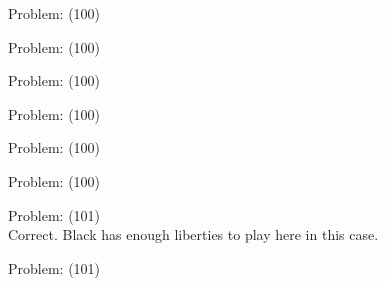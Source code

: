 \documentclass[11pt]{article}
\begin{document}
\begin{minipage}[t]{0.5\textwidth}
  {\centering
  
  Problem: (100)\\
  
  }
\end{minipage}
\begin{minipage}[t]{0.5\textwidth}
  {\centering
  
  Problem: (100)\\
  
  }
\end{minipage}
\begin{minipage}[t]{0.5\textwidth}
  {\centering
  
  Problem: (100)\\
  
  }
\end{minipage}
\begin{minipage}[t]{0.5\textwidth}
  {\centering
  
  Problem: (100)\\
  
  }
\end{minipage}
\begin{minipage}[t]{0.5\textwidth}
  {\centering
  
  Problem: (100)\\
  
  }
\end{minipage}
\begin{minipage}[t]{0.5\textwidth}
  {\centering
  
  Problem: (100)\\
  
  }
\end{minipage}
\begin{minipage}[t]{0.5\textwidth}
  {\centering
  
  Problem: (101)\\
  Correct. Black has enough liberties to play here in this case.\\
  }
\end{minipage}
\begin{minipage}[t]{0.5\textwidth}
  {\centering
  
  Problem: (101)\\
  
  }
\end{minipage}
\end{document}
